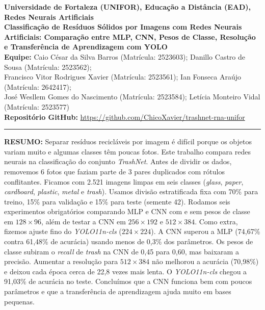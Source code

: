 \documentclass[11pt,a4paper]{article}
\begin{document}
\begin{center}
    {\footnotesize\bfseries\color{PrimaryBlue} Universidade de Fortaleza (UNIFOR), Educação a Distância (EAD), Redes Neurais Artificiais}\\[6pt]
    {\large\bfseries Classificação de Resíduos Sólidos por Imagens com Redes Neurais Artificiais: Comparação entre MLP, CNN, Pesos de Classe, Resolução e Transferência de Aprendizagem com YOLO}\\[8pt]
    {\small
    \textbf{Equipe:} Caio César da Silva Barros (Matrícula: 2523603); Danillo Castro de Sousa (Matrícula: 2523562);\\
    Francisco Vitor Rodrigues Xavier (Matrícula: 2523561); Ian Fonseca Araújo (Matrícula: 2642417);\\
    José Wesllem Gomes do Nascimento (Matrícula: 2523584); Letícia Monteiro Vidal (Matrícula: 2523577)\\[4pt]
    \textbf{Repositório GitHub:} \url{https://github.com/ChicoXavier/trashnet-rna-unifor}
    }
\end{center}
\hrule
\vspace{6pt}

\noindent\textbf{RESUMO:} Separar resíduos recicláveis por imagem é difícil porque os objetos variam muito e algumas classes têm poucas fotos. Este trabalho compara redes neurais na classificação do conjunto \textit{TrashNet}. Antes de dividir os dados, removemos 6 fotos que faziam parte de 3 pares duplicados com rótulos conflitantes. Ficamos com 2.521 imagens limpas em seis classes (\textit{glass}, \textit{paper}, \textit{cardboard}, \textit{plastic}, \textit{metal} e \textit{trash}). Usamos divisão estratificada fixa com 70\% para treino, 15\% para validação e 15\% para teste (semente 42). Rodamos seis experimentos obrigatórios comparando MLP e CNN com e sem pesos de classe em $128 \times 96$, além de testar a CNN em $256 \times 192$ e $512 \times 384$. Como extra, fizemos ajuste fino do \textit{YOLO11n-cls} ($224 \times 224$). A CNN superou a MLP (74,67\% contra 61,48\% de acurácia) usando menos de 0,3\% dos parâmetros. Os pesos de classe subiram o \textit{recall} de \textit{trash} na CNN de 0,45 para 0,60, mas baixaram a precisão. Aumentar a resolução para $512 \times 384$ não melhorou a acurácia (70,98\%) e deixou cada época cerca de 22,8 vezes mais lenta. O \textit{YOLO11n-cls} chegou a 91,03\% de acurácia no teste. Concluímos que a CNN funciona bem com poucos parâmetros e que a transferência de aprendizagem ajuda muito em bases pequenas.
\end{document}
